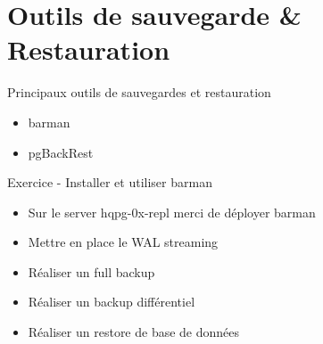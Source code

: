 
\section{Outils de sauvegarde \& Restauration}


\begin{frame}[fragile]{Principaux outils de sauvegardes et restauration}

   \begin{itemize}
      \item barman
      \item pgBackRest
   \end{itemize}

\begin{toile}
\end{toile}

\end{frame}


\begin{frame}[fragile]{Exercice - Installer et utiliser barman}

   \begin{itemize}
      \item Sur le server hqpg-0x-repl merci de déployer barman
      \item Mettre en place le WAL streaming
      \item Réaliser un full backup
      \item Réaliser un backup différentiel
      \item Réaliser un restore de base de données
   \end{itemize}

\end{frame}

